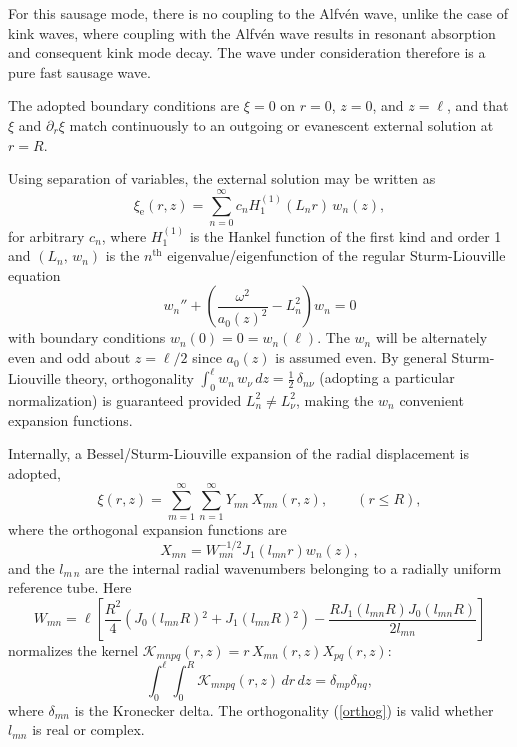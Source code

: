 \documentclass[12pt]{iopart}
\newcommand{\half}{{\textstyle\frac{1}{2}}}
\renewcommand{\L}{{\ell}}
\begin{document}
For this sausage mode, there is no coupling to the Alfv\'en wave, unlike the case of kink waves, where coupling with the Alfv\'en wave results in resonant absorption and consequent kink mode decay. The wave under consideration therefore is a pure fast sausage wave.

The adopted boundary conditions are $\xi=0$ on $r=0$, $z=0$, and $z=\L$, and that $\xi$ and $\partial_r\xi$ match continuously to an outgoing or evanescent external solution at $r=R$.

Using separation of variables, the external solution may be written as
\begin{equation}
\xi_\text{e}(r,z)=\sum_{n=0}^\infty c_n H_1^{(1)}(L_n r) \, w_n(z),    \label{xiext}
\end{equation}
for arbitrary $c_n$, where $H_1^{(1)}$ is the Hankel function of the first kind and order 1 and $(L_n,\,w_n)$ is the $n^\text{th}$ eigenvalue/eigenfunction of the {regular} Sturm-Liouville equation
\begin{equation}
w_n'' +\left(\frac{\omega^2}{a_0(z)^2}-L_n^2\right)w_n=0   \label{SL}
\end{equation}
with boundary conditions $w_n(0)=0=w_n(\L)$. The $w_n$ will be alternately even and odd about $z=\L/2$ since $a_0(z)$ is assumed even. By general Sturm-Liouville theory, orthogonality {$\int_0^\L w_n\, w_\nu\,dz=\half\,\delta_{n\nu}$ (adopting a particular normalization)} is guaranteed provided $L_n^2\ne L_\nu^2$, making the $w_n$ convenient expansion functions.

Internally, a Bessel/Sturm-Liouville expansion of the radial displacement is adopted,
\begin{equation}
\xi(r,{z}) = \sum_{m=1}^\infty \sum_{n=1}^\infty Y_{mn}\, X_{mn}(r,z), \qquad (r\le R),\label{expand}
\end{equation}
where the orthogonal expansion functions are
\begin{equation}
X_{mn}=W_{mn}^{-1/2}J_1(l_{mn}r)w_n(z),   \label{X}
\end{equation}
and the $l_{m\,n}$ are the internal radial wavenumbers belonging to a radially uniform reference tube.
Here
\begin{equation}
W_{mn} =\L\left[\frac{R^2}{4} \left( J_0( l_{mn}R){}^2+ J_1( l_{mn}R){}^2\right)
     -\frac{R J_1(l_{mn}R) J_0(l_{mn}R)}{2 l_{mn}}\right]  \label{W}
\end{equation}
normalizes the kernel $\mathcal{K}_{mnpq}(r,z)=r\,X_{mn}(r,z)X_{pq}(r,z)$:
\begin{equation}
\int_0^\L\!\!\! \int_0^R  \mathcal{K}_{mnpq}(r,z)\, dr \,dz= \delta_{mp} \delta_{n q},
\label{orthog}
\end{equation}
where $\delta_{mn}$ is the Kronecker delta. %
The orthogonality (\ref{orthog}) is valid whether $l_{mn}$ is real or complex. 
\end{document}
